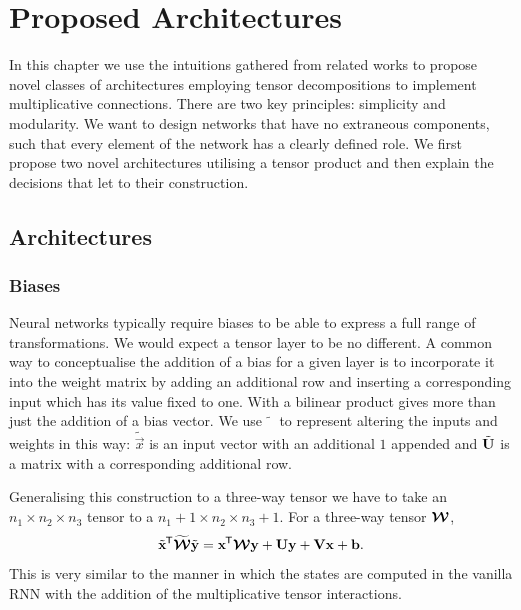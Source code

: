 
\chapter{Proposed Architectures}\label{C:arch}
In this chapter we use the intuitions gathered from related works to propose novel classes of
architectures employing tensor decompositions to implement multiplicative connections. There are
two key principles: simplicity and modularity. We want to design networks that have no extraneous
components, such that every element of the network has a clearly defined role. We first propose
two novel architectures utilising a tensor product and then explain the decisions that let to their
construction.

\section{Architectures}
\subsection{Biases}
Neural networks typically require biases to be able to express a full range of transformations. We would
expect a tensor layer to be no different. A common way to conceptualise the addition of a bias for a
given layer is to incorporate it into the weight matrix by adding an additional row and inserting a
corresponding input which has its value fixed to one. With a bilinear product gives more than
just the addition of a bias vector. We use \(\tilde{\phantom{x}}\) to represent altering the inputs
and weights in this way: \(\tilde{\vec{x}}\) is an input vector with an additional \(1\) appended
and \(\tilde{\mathbf{U}}\) is a matrix with a corresponding additional row.

Generalising this construction to a three-way tensor we have to take an \(n_1 \times n_2 \times n_3\)
tensor to a \(n_1 + 1 \times n_2 \times n_3 +1\). For a three-way tensor \(\bm{\mathcal{W}}\),
\begin{equation}\label{eq:tensorbias}
	\tilde{\mathbf{x}}^{\mkern-1.5mu\mathsf{T}}\widetilde{\bm{\mathcal{W}}}\tilde{\mathbf{y}}
	= \mathbf{x}^{\mkern-1.5mu\mathsf{T}}\bm{\mathcal{W}}\mathbf{y} + \mathbf{U}\mathbf{y} + \mathbf{V}\mathbf{x} + \mathbf{b}.
\end{equation} This is very similar to the manner in which the states are computed in the vanilla
RNN with the addition of the multiplicative tensor interactions.

